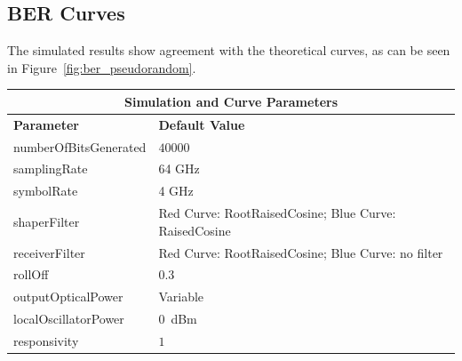 \begin{refsection}
\subsection*{BER Curves}

The simulated results show agreement with the theoretical curves, as can be seen in Figure~\ref{fig:ber_pseudorandom}.

\begin{table}[H]
	\centering
	\begin{tabular}{|l|l|}
	\hline
	\multicolumn{2}{|c|}{ \textbf{Simulation and Curve Parameters} } \\
		\hline
		\textbf{Parameter}     & \textbf{Default Value}                                     \\\hline
		numberOfBitsGenerated  & $40000$	                                                \\\hline
		samplingRate           & 64 GHz															\\\hline
		symbolRate		       & 4 GHz                                                    		\\\hline
		shaperFilter		   & Red Curve: RootRaisedCosine; Blue Curve: RaisedCosine	    \\\hline
		receiverFilter		   & Red Curve: RootRaisedCosine; Blue Curve: no filter 		\\\hline
		rollOff				   & 0.3														\\\hline
		outputOpticalPower     & Variable                                                   \\ \hline
		localOscillatorPower   & $0$~dBm                                                    \\ \hline
		responsivity           & $1$                                                        \\ \hline

\end{tabular}
\end{table}
\end{refsection}

